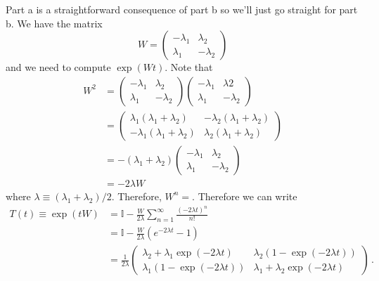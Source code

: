 Part a is a straightforward consequence of part b so we'll just go straight for part b.
We have the matrix
\begin{equation*}
  W =
  \begin{pmatrix}
    - \lambda_1 & \lambda_2 \\ \lambda_1 & - \lambda_2
  \end{pmatrix}
\end{equation*}
and we need to compute $\exp \left( W t \right)$.
Note that
\begin{align*}
  W^2 &=
  \begin{pmatrix}
    - \lambda_1 & \lambda_2 \\ \lambda_1 & - \lambda_2
  \end{pmatrix}
  \begin{pmatrix}
    - \lambda_1 & \lambda 2 \\ \lambda_1 & - \lambda_2
  \end{pmatrix}
  \\
  &=
  \begin{pmatrix}
	  \lambda_1(\lambda_1 + \lambda_2) & -\lambda_2 (\lambda_1 + \lambda_2) \\
	  -\lambda_1 (\lambda_1 + \lambda_2) & \lambda_2 (\lambda_1 + \lambda_2)
  \end{pmatrix}
  \\
  &=
  -(\lambda_1 + \lambda_2)
  \begin{pmatrix}
	  - \lambda_1 & \lambda_2 \\ \lambda_1 & -\lambda_2
  \end{pmatrix}
  \\
  &= -2 \lambda W
\end{align*}
where $\lambda \equiv (\lambda_1 + \lambda_2) / 2$.
Therefore, $W^n = $.
Therefore we can write
\begin{align*}
  T(t) \equiv \exp(t W)
  &= \mathbb{I} - \frac{W}{2 \lambda} \sum_{n=1}^\infty \frac{(-2 \lambda t)^n}{n!} \\
  &= \mathbb{I} - \frac{W}{2 \lambda} \left( e^{-2 \lambda t} - 1 \right) \\
  &= \frac{1}{2\lambda}
  \begin{pmatrix}
    \lambda_2 + \lambda_1 \exp(-2 \lambda t) & \lambda_2 ( 1 - \exp(-2 \lambda t)) \\
    \lambda_1 ( 1 - \exp(-2 \lambda t)) & \lambda_1 + \lambda_2 \exp(-2 \lambda t)
  \end{pmatrix}
  \, .
\end{align*}
